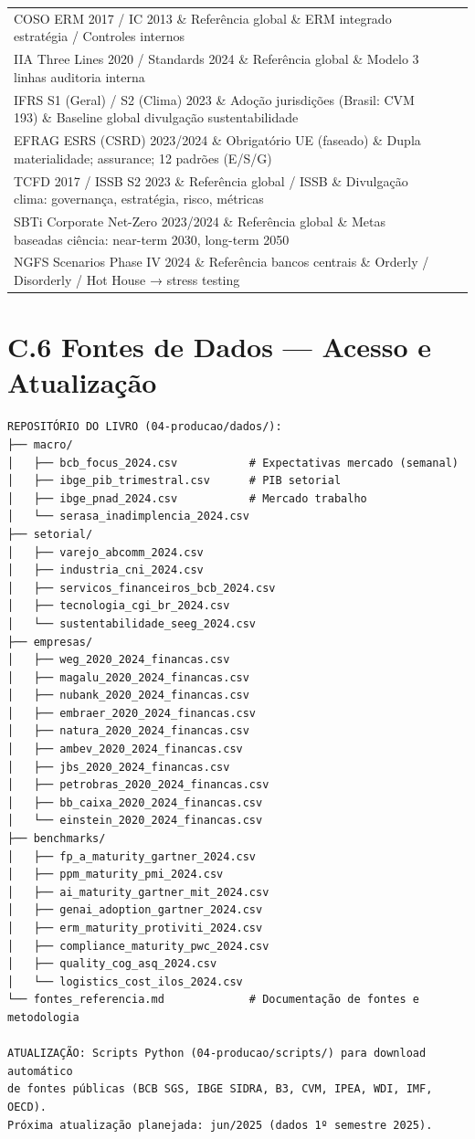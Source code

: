 \begin{longtable}{p{4cm}p{4cm}p{7cm}}
COSO ERM 2017 / IC 2013 \& Referência global \& ERM integrado estratégia / Controles internos\\
IIA Three Lines 2020 / Standards 2024 \& Referência global \& Modelo 3 linhas auditoria interna\\
IFRS S1 (Geral) / S2 (Clima) 2023 \& Adoção jurisdições (Brasil: CVM 193) \& Baseline global divulgação sustentabilidade\\
EFRAG ESRS (CSRD) 2023/2024 \& Obrigatório UE (faseado) \& Dupla materialidade; assurance; 12 padrões (E/S/G)\\
TCFD 2017 / ISSB S2 2023 \& Referência global / ISSB \& Divulgação clima: governança, estratégia, risco, métricas\\
SBTi Corporate Net-Zero 2023/2024 \& Referência global \& Metas baseadas ciência: near-term 2030, long-term 2050\\
NGFS Scenarios Phase IV 2024 \& Referência bancos centrais \& Orderly / Disorderly / Hot House → stress testing\\
\end{longtable}

\section*{C.6 Fontes de Dados — Acesso e Atualização}

\begin{verbatim}
REPOSITÓRIO DO LIVRO (04-producao/dados/):
├── macro/
│   ├── bcb_focus_2024.csv           # Expectativas mercado (semanal)
│   ├── ibge_pib_trimestral.csv      # PIB setorial
│   ├── ibge_pnad_2024.csv           # Mercado trabalho
│   └── serasa_inadimplencia_2024.csv
├── setorial/
│   ├── varejo_abcomm_2024.csv
│   ├── industria_cni_2024.csv
│   ├── servicos_financeiros_bcb_2024.csv
│   ├── tecnologia_cgi_br_2024.csv
│   └── sustentabilidade_seeg_2024.csv
├── empresas/
│   ├── weg_2020_2024_financas.csv
│   ├── magalu_2020_2024_financas.csv
│   ├── nubank_2020_2024_financas.csv
│   ├── embraer_2020_2024_financas.csv
│   ├── natura_2020_2024_financas.csv
│   ├── ambev_2020_2024_financas.csv
│   ├── jbs_2020_2024_financas.csv
│   ├── petrobras_2020_2024_financas.csv
│   ├── bb_caixa_2020_2024_financas.csv
│   └── einstein_2020_2024_financas.csv
├── benchmarks/
│   ├── fp_a_maturity_gartner_2024.csv
│   ├── ppm_maturity_pmi_2024.csv
│   ├── ai_maturity_gartner_mit_2024.csv
│   ├── genai_adoption_gartner_2024.csv
│   ├── erm_maturity_protiviti_2024.csv
│   ├── compliance_maturity_pwc_2024.csv
│   ├── quality_cog_asq_2024.csv
│   └── logistics_cost_ilos_2024.csv
└── fontes_referencia.md             # Documentação de fontes e metodologia

ATUALIZAÇÃO: Scripts Python (04-producao/scripts/) para download automático
de fontes públicas (BCB SGS, IBGE SIDRA, B3, CVM, IPEA, WDI, IMF, OECD).
Próxima atualização planejada: jun/2025 (dados 1º semestre 2025).
\end{verbatim}

